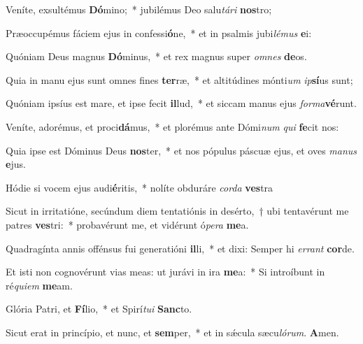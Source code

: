 \item Veníte, exsultémus \textbf{Dó}mino;~* jubilémus Deo salu\textit{tá}\textit{ri} \textbf{nos}tro;

\item Præoccupémus fáciem ejus in confessi\textbf{ó}ne,~* et in psalmis jubi\textit{lé}\textit{mus} \textbf{e}i:

\item Quóniam Deus magnus \textbf{Dó}minus,~* et rex magnus super \textit{om}\textit{nes} \textbf{de}os.

\item Quia in manu ejus sunt omnes fines \textbf{ter}ræ,~* et altitúdines mónti\textit{um} \textit{ip}\textbf{sí}us sunt;\\

\item Quóniam ipsíus est mare, et ipse fecit \textbf{il}lud,~* et siccam manus ejus \textit{for}\textit{ma}\textbf{vé}runt.

\item Veníte, adorémus, et proci\textbf{dá}mus,~* et plorémus ante Dómi\textit{num} \textit{qui} \textbf{fe}cit nos:

\item Quia ipse est Dóminus Deus \textbf{nos}ter,~* et nos pópulus páscuæ ejus, et oves \textit{ma}\textit{nus} \textbf{e}jus.\\

\item Hódie si vocem ejus audi\textbf{é}ritis,~* nolíte obduráre \textit{cor}\textit{da} \textbf{ves}tra

\item Sicut in irritatióne, secúndum diem tentatiónis in desérto,~† ubi tentavérunt me patres \textbf{ves}tri:~* probavérunt me, et vidérunt ó\textit{pe}\textit{ra} \textbf{me}a.

\item Quadragínta annis offénsus fui generatióni \textbf{il}li,~* et dixi: Semper hi \textit{er}\textit{rant} \textbf{cor}de.

\item Et isti non cognovérunt vias meas: ut jurávi in ira \textbf{me}a:~* Si introíbunt in ré\textit{qui}\textit{em} \textbf{me}am.

\item Glória Patri, et \textbf{Fí}lio,~* et Spirí\textit{tu}\textit{i} \textbf{Sanc}to.

\item Sicut erat in princípio, et nunc, et \textbf{sem}per,~* et in sǽcula sæcu\textit{ló}\textit{rum}. \textbf{A}men.\\
